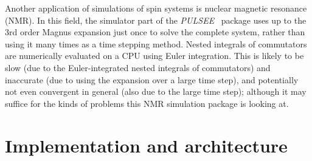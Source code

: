 \documentclass{jors}
\begin{document}
		Another application of simulations of spin systems is nuclear magnetic resonance (NMR).
		In this field, the simulator part of the \emph{PULSEE}~\cite{candoli_pulsee_2021} package uses up to the 3rd order Magnus expansion just once to solve the complete system, rather than using it many times as a time stepping method.
		Nested integrals of commutators are numerically evaluated on a CPU using Euler integration.
		This is likely to be slow (due to the Euler-integrated nested integrals of commutators) and inaccurate (due to using the expansion over a large time step), and potentially not even convergent in general (also due to the large time step); although it may suffice for the kinds of problems this NMR simulation package is looking at.



\section{Implementation and architecture}
\end{document}

